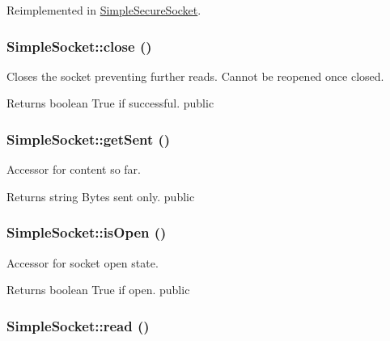 Reimplemented in \hyperlink{class_simple_secure_socket_ad027b44d55717c0baa0547cf66e0fa0f}{SimpleSecureSocket}.\hypertarget{class_simple_socket_ad908752f647641818fa09c8277bd5b1c}{
\subsubsection[{close}]{\setlength{\rightskip}{0pt plus 5cm}SimpleSocket::close ()}}
\label{class_simple_socket_ad908752f647641818fa09c8277bd5b1c}
Closes the socket preventing further reads. Cannot be reopened once closed. \begin{DoxyReturn}{Returns}
boolean True if successful.  public 
\end{DoxyReturn}
\hypertarget{class_simple_socket_a81d45c8f467f9b1edb3eec81dfea3d18}{
\subsubsection[{getSent}]{\setlength{\rightskip}{0pt plus 5cm}SimpleSocket::getSent ()}}
\label{class_simple_socket_a81d45c8f467f9b1edb3eec81dfea3d18}
Accessor for content so far. \begin{DoxyReturn}{Returns}
string Bytes sent only.  public 
\end{DoxyReturn}
\hypertarget{class_simple_socket_a62784f70653974c9a2dc1f7f74af04a4}{
\subsubsection[{isOpen}]{\setlength{\rightskip}{0pt plus 5cm}SimpleSocket::isOpen ()}}
\label{class_simple_socket_a62784f70653974c9a2dc1f7f74af04a4}
Accessor for socket open state. \begin{DoxyReturn}{Returns}
boolean True if open.  public 
\end{DoxyReturn}
\hypertarget{class_simple_socket_a893956f7b624e6093f5e0ca51d024e3a}{
\subsubsection[{read}]{\setlength{\rightskip}{0pt plus 5cm}SimpleSocket::read ()}}
\label{class_simple_socket_a893956f7b624e6093f5e0ca51d024e3a}
